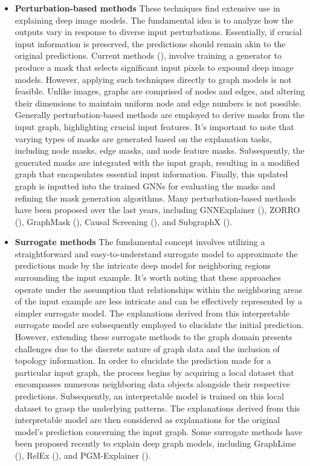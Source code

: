 \documentclass[binding=0.6cm]{sapthesis}
\newcommand{\mycite}[1]{(\cite{#1})}
\begin{document}
\begin{itemize}
    \item \textbf{Perturbation-based methods} These techniques find extensive use in explaining deep image models. The fundamental idea is to analyze how the outputs vary in response to diverse input perturbations. Essentially, if crucial input information is preserved, the predictions should remain akin to the original predictions. Current methods \mycite{dabkowski2017-saliency,yuan2020-discrete-masks,chen2018-learning}, involve training a generator to produce a mask that selects significant input pixels to expound deep image models. However, applying such techniques directly to graph models is not feasible. Unlike images, graphs are comprised of nodes and edges, and altering their dimensions to maintain uniform node and edge numbers is not possible. Generally perturbation-based methods are employed to derive masks from the input graph, highlighting crucial input features. It's important to note that varying types of masks are generated based on the explanation tasks, including node masks, edge masks, and node feature masks. Subsequently, the generated masks are integrated with the input graph, resulting in a modified graph that encapsulates essential input information. Finally, this updated graph is inputted into the trained GNNs for evaluating the masks and refining the mask generation algorithms. Many perturbation-based methods have been proposed over the last years, including GNNExplainer \mycite{ying2019-gnnexplainer}, ZORRO \mycite{funke2021-hard}, GraphMask \mycite{schlichtkrull2022-interpreting}, Causal Screening \mycite{wang2021-causal}, and SubgraphX \mycite{yuan2021-subgraphx}.
    
    \item \textbf{Surrogate methods} The fundamental concept involves utilizing a straightforward and easy-to-understand surrogate model to approximate the predictions made by the intricate deep model for neighboring regions surrounding the input example. It's worth noting that these approaches operate under the assumption that relationships within the neighboring areas of the input example are less intricate and can be effectively represented by a simpler surrogate model. The explanations derived from this interpretable surrogate model are subsequently employed to elucidate the initial prediction. However, extending these surrogate methods to the graph domain presents challenges due to the discrete nature of graph data and the inclusion of topology information. In order to elucidate the prediction made for a particular input graph, the process begins by acquiring a local dataset that encompasses numerous neighboring data objects alongside their respective predictions. Subsequently, an interpretable model is trained on this local dataset to grasp the underlying patterns. The explanations derived from this interpretable model are then considered as explanations for the original model's prediction concerning the input graph. Some surrogate methods have been proposed recently to explain deep graph models, including GraphLime \mycite{huang2020-graphlime}, RelEx \mycite{zhang2021-relex}, and PGM-Explainer \mycite{vu2020-pgm-explainer}.
    

\end{itemize}
\end{document}
